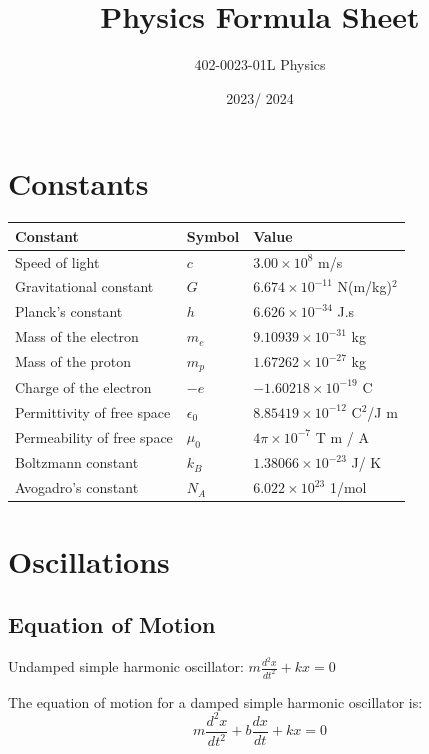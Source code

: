 \documentclass[12pt,a4paper]{article}
\title{Physics Formula Sheet}
\author{402-0023-01L  Physics}
\date{2023/ 2024}
\begin{document}
	\maketitle
	
	\section*{Constants}
	\begin{tabular}{lll}
		\toprule
		Constant & Symbol & Value \\
		\midrule
		Speed of light & \( c \) & \( 3.00 \times 10^8 \) m/s \\
		Gravitational constant & \( G \) & \( 6.674 \times 10^{-11} \) N(m/kg)\(^2\) \\
		Planck's constant & \( h \) & \( 6.626 \times 10^{-34} \) J.s \\
		Mass of the electron & \( m_e \) & \( 9.10939 \times 10^{-31} \) kg \\
		Mass of the proton & \( m_p \) & \( 1.67262 \times 10^{-27} \) kg \\
		Charge of the electron & \(-e\) & \(-1.60218 \times 10^{-19} \) C \\
		Permittivity of free space & \(\epsilon_0\) & \( 8.85419 \times 10^{-12} \) C\(^2\)/J m \\
		Permeability of free space & \(\mu_0\) & \( 4 \pi \times 10^{-7} \) T m / A \\
		Boltzmann constant & \( k_B \) & \( 1.38066 \times 10^{-23} \) J/ K \\
		Avogadro's constant & \( N_A \) & \( 6.022 \times 10^{23} \) 1/mol \\
		\bottomrule
	\end{tabular}
	
	\section*{Oscillations}
	\subsection*{Equation of Motion}
	Undamped simple harmonic oscillator:
	\( 	m \frac{d^2 x}{dt^2} + kx = 0\)
	
	The equation of motion for a damped simple harmonic oscillator is:
	\[
	m \frac{d^2 x}{dt^2} + b \frac{dx}{dt} + kx = 0
	\]
	
\end{document}
